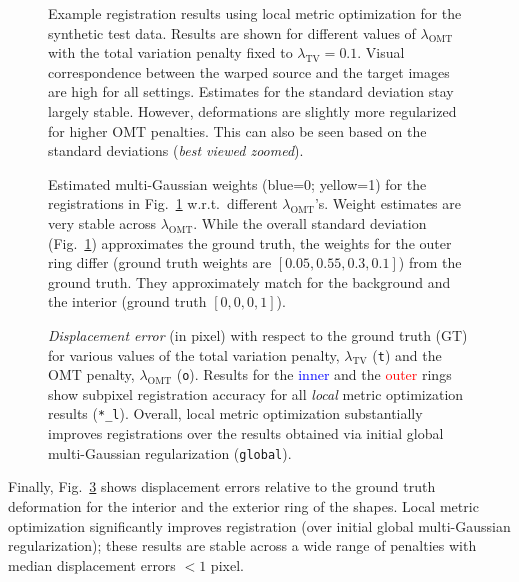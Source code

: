 \documentclass[10pt,twocolumn,letterpaper,table]{article}
\numberwithin{equation}{section}
\theoremstyle{plain}
\theoremstyle{definition}
\def\wrt{w.r.t.}
\begin{document}
\begin{figure}[t!]
  \caption{Example registration results using local metric optimization for the synthetic test data. Results are shown for different values of $\lambda_{\text{OMT}}$ with the total variation penalty fixed to $\lambda_{\text{TV}}=0.1$. Visual correspondence between the warped source and the target images are high for all settings. Estimates for the standard deviation stay largely stable. However, deformations are slightly more regularized for higher OMT penalties. This can also be seen based on the standard deviations (\emph{best viewed zoomed}).}
  \label{fig:synth_example_results_images}
\end{figure}

\begin{figure}
\caption{Estimated multi-Gaussian weights (blue=0; yellow=1) for the registrations in Fig.~\ref{fig:synth_example_results_images} \wrt~different $\lambda_{\text{OMT}}$'s.
Weight estimates are very stable across $\lambda_{\text{OMT}}$. While the overall standard deviation (Fig.~\ref{fig:synth_example_results_images}) approximates the ground truth, the weights for the outer ring differ (ground truth weights are $[0.05, 0.55, 0.3, 0.1]$) from the ground truth. They approximately match for the background and the interior (ground truth $[0,0,0,1]$).}
  \label{fig:synth_example_results_weights}
\end{figure}

\begin{figure}
  \caption{\emph{Displacement error} (in pixel) with respect to the ground truth (GT) for various values of the total variation penalty, $\lambda_{\text{TV}}$ (\texttt{t}) and the OMT penalty, $\lambda_{\text{OMT}}$ (\texttt{o}). Results for the \textcolor{blue}{inner} and the \textcolor{red}{outer} rings show subpixel registration accuracy for all \emph{local} metric optimization results (\texttt{*\_l}). Overall, local metric optimization substantially improves registrations over the results obtained via initial global multi-Gaussian regularization (\texttt{global}).
    \label{fig:displacement_errors_within_shape}}
\end{figure}

Finally, Fig.~\ref{fig:displacement_errors_within_shape} shows displacement errors relative to the ground truth deformation for the interior and the exterior ring of the shapes. Local metric optimization significantly improves registration (over initial global multi-Gaussian regularization); these results are stable across a wide range of penalties with median displacement errors $<1$ pixel.
\end{document}
